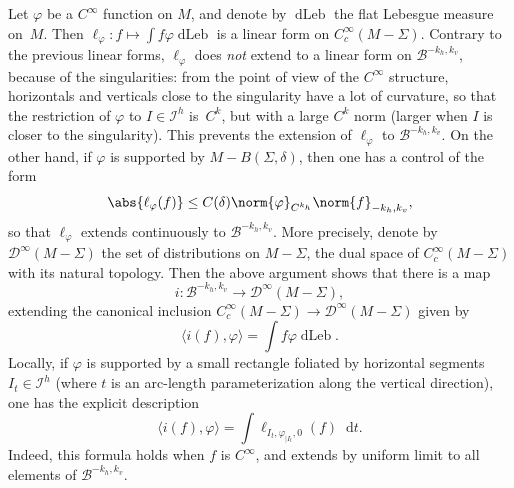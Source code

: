 \documentclass[JEP,XML,SOM,Unicode]{cedram}
\newcommand{\boI}{\mathcal{I}}
\newcommand{\boB}{\mathcal{B}}
\newcommand{\boD}{\mathcal{D}}
\newcommand{\dd}{\mathop{}\!\mathrm{d}}
\newcommand{\restr}{|}
\DeclareMathOperator{\dLeb}{dLeb}
\let\phi\varphi
\theoremstyle{definition}
\numberwithin{equation}{section}
\begin{document}
Let $\phi$ be a $C^\infty$ function on $M$, and denote by $\dLeb$ the flat
Lebesgue measure on~$M$. Then $\ell_\phi : f \mapsto \int f \phi \dLeb$ is a
linear form on $C^\infty_c(M-\Sigma)$. Contrary to the previous linear forms,
$\ell_\phi$ does \emph{not} extend to a linear form on $\boB^{-k_h, k_v}$,
because of the singularities: from the point of view of the $C^\infty$
structure, horizontals and verticals close to the singularity have a lot of
curvature, so that the restriction of $\phi$ to $I \in \boI^h$ is~$C^k$, but
with a large $C^k$ norm (larger when $I$ is closer to the singularity).
This prevents the extension of $\ell_\phi$ to $\boB^{-k_h, k_v}$. On the
other hand, if $\phi$ is supported by $M-B(\Sigma, \delta)$, then one has a
control of the form
\[
\abs{\ell_\phi(f)} \leq C(\delta)
\norm{\phi}_{C^{k_h}}\norm{f}_{-k_h, k_v},
\]
so that $\ell_\phi$ extends
continuously to $\boB^{-k_h, k_v}$. More precisely, denote by
$\boD^\infty(M-\Sigma)$ the set of distributions on $M-\Sigma$, \ie the
dual space of $C^\infty_c(M-\Sigma)$ with its natural topology. Then the
above argument shows that there is a map
\[
i : \boB^{-k_h, k_v} \to
\boD^\infty(M-\Sigma),
\]
extending the canonical inclusion
$C^\infty_c(M-\Sigma) \to \boD^\infty(M-\Sigma)$ given by
\[
\langle i(f), \phi
\rangle = \int f \phi \dLeb.
\]
Locally, if $\phi$ is supported by a small
rectangle foliated by horizontal segments $I_t \in \boI^h$ (where $t$ is an
arc-length parameterization along the vertical direction), one has the
explicit description
\begin{equation}
\label{eq:decrit_if}
\langle i(f), \phi \rangle = \int \ell_{I_t, \phi_{\restr I_t}, 0}(f) \dd t.
\end{equation}
Indeed, this formula holds when $f$ is $C^\infty$, and extends by uniform
limit to all elements of $\boB^{-k_h, k_v}$.
\end{document}
